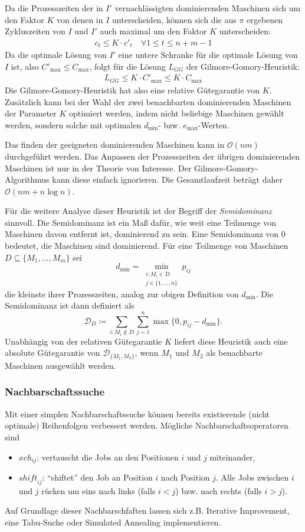 \documentclass{scrreprt}
\begin{document}
Da die Prozesszeiten der in $I'$ vernachlässigten dominierenden Maschinen sich um den Faktor $K$ von denen in $I$ unterscheiden, 
können sich die aus $\pi$ ergebenen Zykluszeiten von $I$ und $I'$ auch maximal um den Faktor $K$ unterscheiden:
\begin{align}
    c_t \leq K\cdot c'_t \quad \forall 1\leq t\leq n+m-1
\end{align}
Da die optimale Lösung von $I'$ eine untere Schranke für die optimale Lösung von $I$ ist, also $C'_{\max} \leq C_{\max}$, folgt für die Lösung $L_{GG}$ der
Gilmore-Gomory-Heuristik:
\begin{align}
    L_{GG} \leq K\cdot C'_{\max} \leq K\cdot C_{\max}
\end{align}
Die Gilmore-Gomory-Heuristik hat also eine relative Gütegarantie von $K$.
Zusätzlich kann bei der Wahl der zwei benachbarten dominierenden Maschinen der Parameter $K$ optimiert werden, indem nicht beliebige Maschinen gewählt werden,
sondern solche mit optimalen $d_{\min}$- bzw. $e_{\max}$-Werten.

Das finden der geeigneten dominierenden Maschinen kann in $\mathcal{O}(nm)$ durchgeführt werden. 
Das Anpassen der Prozesszeiten der übrigen dominierenden Maschinen ist nur in der Theorie von Interesse.
Der Gilmore-Gomory-Algorithmus kann diese einfach ignorieren.
Die Gesamtlaufzeit beträgt daher $\mathcal{O}(nm + n\log n)$.

Für die weitere Analyse dieser Heuristik ist der Begriff der \textit{Semidominanz} sinnvoll.
Die Semidominanz ist ein Maß dafür, wie weit eine Teilmenge von Maschinen davon entfernt ist, dominierend zu sein.
Eine Semidominanz von $0$ bedeutet, die Maschinen sind dominierend.
Für eine Teilmenge von Maschinen $D\subseteq\{M_1,\ldots,M_m\}$ sei 
\[d_{\min} = \min_{\substack{i:M_i\in D \\ j\in\{1,\ldots,n\}}} p_{ij}\] 
die kleinste ihrer Prozesszeiten, analog zur obigen Definition von $d_{\min}$.
Die Semidominanz ist dann definiert als
\[\mathcal{D}_{D} \coloneqq \sum_{i: M_i\not\in D} \sum_{j=1}^n \max\{0,p_{ij}-d_{\min}\} \text{.}\]
Unabhängig von der relativen Gütegarantie $K$ liefert diese Heuristik auch eine absolute Gütegarantie von $\mathcal{D}_{\{M_1,M_2\}}$, 
wenn $M_1$ und $M_2$ als benachbarte Maschinen ausgewählt werden.

\subsubsection{Nachbarschaftssuche}
Mit einer simplen Nachbarschaftssuche können bereits existierende (nicht optimale) Reihenfolgen verbessert werden.
Mögliche Nachbarschaftsoperatoren sind
\begin{itemize}
    \item $\mathit{xch}_{ij}$: vertauscht die Jobs an den Positionen $i$ und $j$ miteinander,
    \item $\mathit{shift}_{ij}$: "`shiftet"' den Job an Position $i$ nach Position $j$. 
        Alle Jobs zwischen $i$ und $j$ rücken um eins nach links (falls $i<j$) bzw. nach rechts (falls $i>j$).
\end{itemize}
Auf Grundlage dieser Nachbarschfaften lassen sich z.B. Iterative Improvement, eine Tabu-Suche oder Simulated Annealing implementieren.
\end{document}

